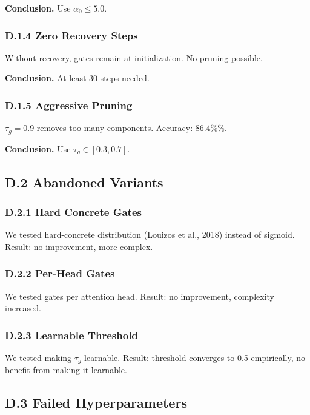 \textbf{Conclusion.} Use $\alpha_0 \leq 5.0$.

\subsubsection{D.1.4 Zero Recovery Steps}

Without recovery, gates remain at initialization. No pruning possible.

\textbf{Conclusion.} At least 30 steps needed.

\subsubsection{D.1.5 Aggressive Pruning}

$\tau_g = 0.9$ removes too many components. Accuracy: 86.4\%\%.

\textbf{Conclusion.} Use $\tau_g \in [0.3, 0.7]$.

\subsection{D.2 Abandoned Variants}

\subsubsection{D.2.1 Hard Concrete Gates}

We tested hard-concrete distribution (Louizos et al., 2018) instead of 
sigmoid. Result: no improvement, more complex.

\subsubsection{D.2.2 Per-Head Gates}

We tested gates per attention head. Result: no improvement, complexity 
increased.

\subsubsection{D.2.3 Learnable Threshold}

We tested making $\tau_g$ learnable. Result: threshold converges to 0.5 
empirically, no benefit from making it learnable.

\subsection{D.3 Failed Hyperparameters}

